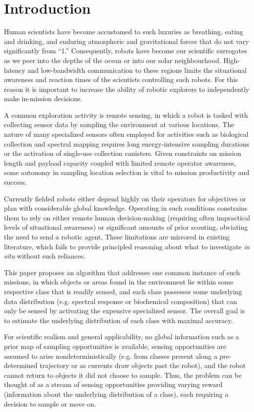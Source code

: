 \section{Introduction}
\label{sec:intro}

Human scientists have become accustomed to such luxuries as breathing, eating
and drinking, and enduring atmospheric and gravitational forces that do not
vary significantly from ``1.''  Consequently, robots have become our scientific
surrogates as we peer into the depths of the ocean or into our solar
neighbourhood.  High-latency and low-bandwidth communication to these regions limits the situational awareness and reaction times of the scientists controlling such robots.  For this reason it is important to increase the ability of robotic explorers to independently make in-mission decisions.

A common exploration activity is remote sensing, in which a robot is tasked with collecting sensor data by sampling the environment at various locations.  The nature of many specialized sensors often employed for activities such as biological collection and spectral mapping requires long energy-intensive sampling durations or the activation of single-use collection canisters.  Given constraints on mission length and payload capacity coupled with limited remote operator awareness, some autonomy in sampling location selection is vital to mission productivity and success.

Currently fielded robots either depend highly on their operators for objectives or plan with considerable global knowledge.  Operating in such conditions constrains them to rely on either remote human decision-making (requiring often impractical levels of situational awareness) or significant amounts of prior scouting, obviating the need to send a robotic agent.  These limitations are mirrored in existing literature, which fails to provide principled reasoning about what to investigate \emph{in situ} without such reliances.

This paper proposes an algorithm that addresses one common instance of such missions, in which objects or areas found in the environment lie within some respective class that is readily sensed, and each class possesses some underlying data distribution (e.g. spectral response or biochemical composition) that can only be sensed by activating the expensive specialized sensor.  The overall goal is to estimate the underlying distribution of each class with maximal accuracy.

For scientific realism and general applicability, no global information such as a prior map of sampling opportunities is available, sensing opportunities are assumed to arise nondeterministically (e.g. from classes present along a pre-determined trajectory or as currents draw objects past the robot), and the robot cannot return to objects it did not choose to sample.  Thus, the problem can be thought of as a stream of sensing opportunities providing varying reward (information about the underlying distribution of a class), each requiring a decision to sample or move on.

